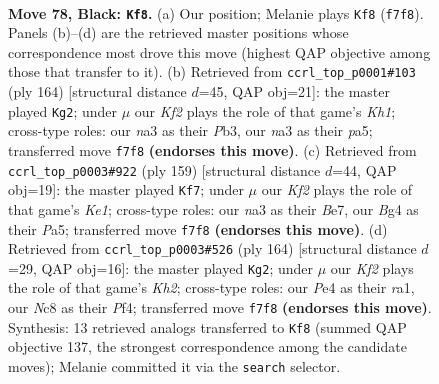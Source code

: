 \documentclass[11pt]{article}
\begin{document}
\clearpage

\begin{figure}[p]\centering
\begin{subfigure}{0.46\textwidth}\centering
\resizebox{\linewidth}{!}{%
\newchessgame
\chessboard[
  setfen={2n4K/2P2k2/p7/P4p1p/4pBb1/N1r3P1/8/R7 b - - 63 78},
  showmover=false,
  pgfstyle=straightmove, color=movearrow, markmove={f7-f8}
]}
\caption{}
\end{subfigure}\hfill
\begin{subfigure}{0.46\textwidth}\centering
\resizebox{\linewidth}{!}{%
\newchessgame
\chessboard[
  setfen={5k2/2b5/5p2/pR3B1p/P3P2P/1Pr5/8/7K w - - 1 83},
  showmover=false,
  pgfstyle=straightmove, color=movearrow, markmove={h1-g2}
]}
\caption{}
\end{subfigure}
\\[4pt]
\begin{subfigure}{0.46\textwidth}\centering
\resizebox{\linewidth}{!}{%
\newchessgame
\chessboard[
  setfen={4k3/2R1b2p/1p5P/p3p1p1/P1P1P1K1/1r3B2/8/8 b - - 10 80},
  showmover=false,
  pgfstyle=straightmove, color=movearrow, markmove={e8-f7}
]}
\caption{}
\end{subfigure}\hfill
\begin{subfigure}{0.46\textwidth}\centering
\resizebox{\linewidth}{!}{%
\newchessgame
\chessboard[
  setfen={8/7p/1p3k2/1BbR1p1P/P1P2P2/8/7K/r7 w - - 85 83},
  showmover=false,
  pgfstyle=straightmove, color=movearrow, markmove={h2-g2}
]}
\caption{}
\end{subfigure}
\caption{\textbf{Move 78, Black: \texttt{Kf8}.} (a) Our position; Melanie plays \texttt{Kf8} (\texttt{f7f8}). Panels (b)--(d) are the retrieved master positions whose correspondence most drove this move (highest QAP objective among those that transfer to it). (b) Retrieved from \texttt{ccrl\_top\_p0001\#103} (ply 164) [structural distance $d$=45, QAP obj=21]: the master played \texttt{Kg2}; under $\mu$ our \emph{Kf2} plays the role of that game's \emph{Kh1}; cross-type roles: our \emph{n}a3 as their \emph{P}b3, our \emph{n}a3 as their \emph{p}a5; transferred move \texttt{f7f8} \textbf{(endorses this move)}. (c) Retrieved from \texttt{ccrl\_top\_p0003\#922} (ply 159) [structural distance $d$=44, QAP obj=19]: the master played \texttt{Kf7}; under $\mu$ our \emph{Kf2} plays the role of that game's \emph{Ke1}; cross-type roles: our \emph{n}a3 as their \emph{B}e7, our \emph{B}g4 as their \emph{P}a5; transferred move \texttt{f7f8} \textbf{(endorses this move)}. (d) Retrieved from \texttt{ccrl\_top\_p0003\#526} (ply 164) [structural distance $d$=29, QAP obj=16]: the master played \texttt{Kg2}; under $\mu$ our \emph{Kf2} plays the role of that game's \emph{Kh2}; cross-type roles: our \emph{P}e4 as their \emph{r}a1, our \emph{N}c8 as their \emph{P}f4; transferred move \texttt{f7f8} \textbf{(endorses this move)}. Synthesis: 13 retrieved analogs transferred to \texttt{Kf8} (summed QAP objective 137, the strongest correspondence among the candidate moves); Melanie committed it via the \texttt{search} selector.}
\label{fig:thought-m155}
\end{figure}
\end{document}
